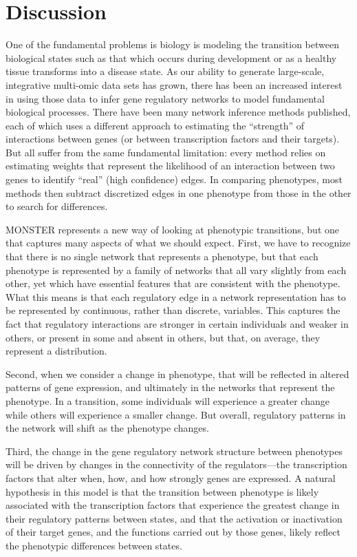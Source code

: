 \section*{Discussion}

One of the fundamental problems is biology is modeling the transition between biological states such as that which occurs during development or as a healthy tissue transforms into a disease state. As our ability to generate large-scale, integrative multi-omic data sets has grown, there has been an increased interest in using those data to infer gene regulatory networks to model fundamental biological processes. There have been many network inference methods published, each of which uses a different approach to estimating the ``strength'' of interactions between genes (or between transcription factors and their targets). But all suffer from the same fundamental limitation: every method relies on estimating weights that represent the likelihood of an interaction between two genes to identify ``real'' (high confidence) edges. In comparing phenotypes, most methods then subtract discretized edges in one phenotype from those in the other to search for differences.

MONSTER represents a  new way of looking at phenotypic transitions, but one that captures many aspects of what we should expect. First, we have to recognize that there is no single network that represents a phenotype, but that each phenotype is represented by a family of networks that all vary slightly from each other, yet which have essential features that are consistent with the phenotype. What this means is that each regulatory edge in a network representation has to be represented by continuous, rather than discrete, variables. This captures the fact that  regulatory interactions are stronger in certain individuals and weaker in others, or present in some and absent in others, but that, on average, they represent a distribution.

Second, when we consider a change in phenotype, that will be reflected in altered patterns of gene expression, and ultimately in the networks that represent the phenotype. In a transition, some individuals will experience a greater change while others will experience a smaller change. But overall, regulatory patterns in the network will shift as the phenotype changes. 

Third, the change in the gene regulatory network structure  between phenotypes will be driven by changes in the connectivity of the regulators---the transcription factors that alter when, how, and how strongly genes are expressed. A natural hypothesis in this model is that the transition between phenotype is likely associated with the transcription factors that experience the greatest change in their regulatory patterns between states, and that the activation or inactivation of their target genes, and the functions carried out by those genes, likely reflect the phenotypic differences between states.

